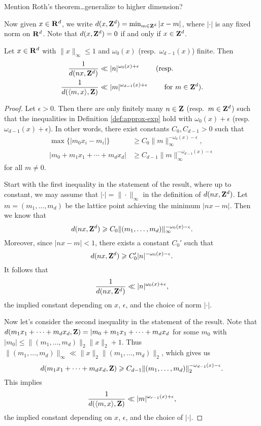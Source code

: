 Mention Roth's theorem\ldots generalize to higher dimension?

Now given $x\in \mathbf{R}^d$, we write $d(x,\mathbf{Z}^d)=\min_{m\in \mathbf{Z}^d} |x-m|$, where 
$|\cdot|$ is any fixed norm on $\mathbf{R}^d$. Note that $d(x,\mathbf{Z}^d)=0$ if and only if 
$x\in \mathbf{Z}^d$. 

\begin{lemma}\label{lem:bound-distance}
Let $x\in \mathbf{R}^d$ with $\|x\|_\infty\leqslant 1$ and $\omega_0(x)$ 
(resp.~$\omega_{d-1}(x)$) finite. Then 
\begin{align*}
	\frac{1}{d(n x,\mathbf{Z}^d)} 
		&\ll |n|^{\omega_0(x)+\epsilon}\qquad \text{ (resp.} \\
	\frac{1}{d(\langle m,x\rangle, \mathbf{Z})} 
		&\ll |m|^{\omega_{d-1}(x)+\epsilon} \qquad\text{ for $m\in \mathbf{Z}^d$).}
\end{align*}
\end{lemma}
\begin{proof}
Let $\epsilon>0$. Then there are only finitely many $n\in \mathbf{Z}$ 
(resp.~$m\in \mathbf{Z}^d$) such that the inequalities in Definition 
\ref{def:approx-exp} hold with $\omega_0(x)+\epsilon$ 
(resp.~$\omega_{d-1}(x)+\epsilon$). In other words, there exist constants 
$C_0, C_{d-1}>0$ such that 
\begin{align*}
	\max\{|m_0 x_i - m_i|\} 
		&\geqslant C_0 \|m\|_\infty^{-\omega_0(x)-\epsilon} ,\\
	|m_0 + m_1 x_1 + \cdots + m_d x_d| 
		&\geqslant C_{d-1} \|m\|_\infty^{-\omega_{d-1}(x)-\epsilon} 
\end{align*}
for all $m\ne 0$. 

Start with the first inequality in the statement of the result, where up to 
constant, we may assume that $|\cdot| = \|\cdot\|_\infty$ in the definition of 
$d(n x,\mathbf{Z}^d)$. Let $m=(m_1,\dots,m_d)$ be the lattice point achieving the 
minimum $|n x - m|$. Then we know that 
\[
	d(n x,\mathbf{Z}^d) \geqslant C_0 \|(m_1,\dots,m_d)\|_\infty^{-\omega_0(x)-\epsilon} .
\]
Moreover, since $|n x-m|<1$, there exists a constant $C_0'$ such that 
\[
	d(n x,\mathbf{Z}^d) \geqslant C_0' |n|^{-\omega_0(x)-\epsilon} .
\]
It follows that 
\[
	\frac{1}{d(n x,\mathbf{Z}^d)} \ll |n|^{\omega_0(x)+\epsilon} ,
\]
the implied constant depending on $x$, $\epsilon$, and the choice of norm 
$|\cdot|$. 

Now let's consider the second inequality in the statement of the result. Note 
that $d(m_1 x_1 + \dots + m_d x_d,\mathbf{Z}) = |m_0 + m_1x_1 + \cdots + m_d x_d$ for 
some $m_0$ with $|m_0| \leqslant \|(m_1,\dots,m_d)\|_2 \|x\|_2 + 1$. Thus 
$\|(m_1,\dots,m_d)\|_\infty \ll \|x\|_2 \|(m_1,\dots,m_d)\|_2$, which gives us 
\[
	d(m_1 x_1 + \cdots + m_d x_d,\mathbf{Z}) \geqslant C_{d-1} \|(m_1,\dots,m_d)\|_2^{-\omega_{d-1}(x)-\epsilon} .
\]
This implies 
\[
	\frac{1}{d(\langle m,x\rangle,\mathbf{Z})} \ll |m|^{\omega_{r-1}(x)+\epsilon} ,
\]
the implied constant depending on $x$, $\epsilon$, and the choice of $|\cdot|$. 
\end{proof}





